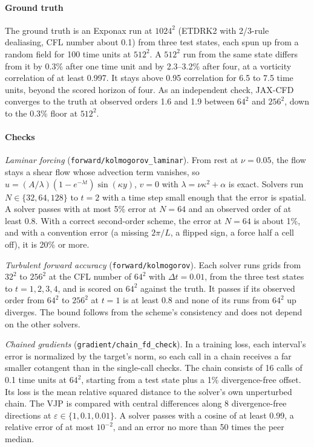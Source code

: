 \paragraph{Ground truth}
The ground truth is an Exponax run at $1024^2$ (ETDRK2 with 2/3-rule dealiasing,
CFL number about 0.1) from three test states, each spun up from a random field
for 100 time units at $512^2$. A $512^2$ run from the same state differs from it by
0.3\% after one time unit and by 2.3--3.2\% after four, at a vorticity
correlation of at least 0.997. It stays above 0.95 correlation for 6.5 to 7.5
time units, beyond the scored horizon of four. As an independent check, JAX-CFD
converges to the truth at observed orders 1.6 and 1.9 between $64^2$ and
$256^2$, down to the 0.3\% floor at $512^2$.

\paragraph{Checks}
\textit{Laminar forcing} (\texttt{forward/kolmogorov\_laminar}). From rest at
$\nu = 0.05$, the flow stays a shear flow whose advection term vanishes, so
$u = (A/\lambda)(1 - e^{-\lambda t})\sin(\kappa y)$, $v = 0$ with
$\lambda = \nu\kappa^2 + \alpha$ is exact. Solvers run $N \in \{32, 64, 128\}$
to $t = 2$ with a time step small enough that the error is spatial. A solver
passes with at most 5\% error at $N = 64$ and an observed order of at least
0.8. With a correct second-order scheme, the error at $N = 64$ is about 1\%,
and with a convention error (a missing $2\pi/L$, a flipped sign, a force half a
cell off), it is 20\% or more.

\textit{Turbulent forward accuracy} (\texttt{forward/kolmogorov}). Each solver
runs grids from $32^2$ to $256^2$ at the CFL number of $64^2$ with
$\Delta t = 0.01$, from the three test states to $t = 1, 2, 3, 4$, and is scored
on $64^2$ against the truth. It passes if its observed order from $64^2$ to
$256^2$ at $t = 1$ is at least 0.8 and none of its runs from $64^2$ up diverges. The bound
follows from the scheme's consistency and does not depend on the other solvers.

\textit{Chained gradients} (\texttt{gradient/chain\_fd\_check}). In a training
loss, each interval's error is normalized by the target's norm, so each call in
a chain receives a far smaller cotangent than in the single-call checks. The
chain consists of 16 calls of 0.1 time units at $64^2$, starting from a
test state plus a 1\% divergence-free offset. Its loss is the mean relative
squared distance to the solver's own unperturbed chain. The VJP is compared with
central differences along 8 divergence-free directions at
$\varepsilon \in \{1, 0.1, 0.01\}$. A solver passes with a cosine of at least
0.99, a relative error of at most $10^{-2}$, and an error no more than 50 times
the peer median.

